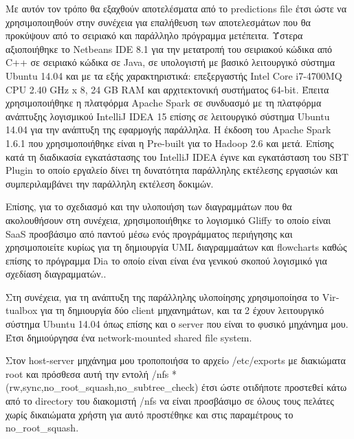 \documentclass{report}
\begin{document}
Με αυτόν τον τρόπο θα εξαχθούν αποτελέσματα από το \textlatin{predictions file} έτσι ώστε να χρησιμοποιηθούν στην συνέχεια για επαλήθευση των αποτελεσμάτων που θα προκύψουν από το σειριακό και παράλληλο πρόγραμμα μετέπειτα. Ύστερα αξιοποιήθηκε το \textlatin{Netbeans IDE} 8.1 για την μετατροπή του σειριακού κώδικα από \textlatin{C}++ σε σειριακό κώδικα σε \textlatin{Java}, σε υπολογιστή με βασικό λειτουργικό σύστημα \textlatin{Ubuntu} 14.04 και με τα εξής χαρακτηριστικά: επεξεργαστής \textlatin{Intel Core i7-4700MQ CPU 2.40 GHz x 8}, 24 \textlatin{GB RAM } και αρχιτεκτονική συστήματος 64-\textlatin{bit}. Έπειτα χρησιμοποιήθηκε η πλατφόρμα \textlatin{Apache Spark} σε συνδυασμό με τη πλατφόρμα ανάπτυξης λογισμικού \textlatin{IntelliJ IDEA} 15 επίσης σε λειτουργικό σύστημα \textlatin{Ubuntu} 14.04 για την ανάπτυξη της εφαρμογής παράλληλα. Η έκδοση του \textlatin{Apache Spark} 1.6.1 που χρησιμοποιήθηκε είναι η \textlatin{Pre-built} για το  \textlatin{Hadoop} 2.6 και μετά. Επίσης κατά τη διαδικασία εγκατάστασης του \textlatin{IntelliJ IDEA} έγινε και εγκατάσταση του \textlatin{SBT Plugin} το οποίο εργαλείο δίνει τη δυνατότητα παράλληλης εκτέλεσης εργασιών και συμπεριλαμβάνει την παράλληλη εκτέλεση δοκιμών.

Επίσης, για το σχεδιασμό και την υλοποιήση των διαγραμμάτων που θα ακολουθήσουν στη συνέχεια, χρησιμοποιήθηκε το λογισμικό \textlatin{Gliffy} το οποίο είναι \textlatin{SaaS} προσβάσιμο από παντού μέσω ενός προγράμματος περιήγησης και χρησιμοποιείτε κυρίως για τη δημιουργία \textlatin{UML} διαγραμμαάτων και \textlatin{flowcharts} καθώς επίσης το πρόγραμμα \textlatin{Dia} το οποίο είναι είναι ένα γενικού σκοπού λογισμικό για σχεδίαση διαγραμματών..  

Στη συνέχεια, για τη ανάπτυξη της παράλληλης υλοποίησης χρησιμοποίησα το \textlatin{Virtualbox} για τη δημιουργία δύο \textlatin{client} μηχανημάτων, και τα 2 έχουν λειτουργικό σύστημα \textlatin{Ubuntu} 14.04 όπως επίσης και ο \textlatin{server} που είναι το φυσικό μηχάνημα μου. Έτσι δημιούργησα ένα \textlatin{network-mounted shared file system}.

 Στον \textlatin{host-server} μηχάνημα μου τροποποιήσα το αρχείo \textlatin{/etc/exports} με διακιώματα \textlatin{root} και πρόσθεσα αυτή την εντολή \textlatin{/nfs} * \textlatin{(rw,sync,no\_root\_squash,no\_subtree\_check)} έτσι ώστε οτιδήποτε προστεθεί κάτω από το \textlatin{directory}  του διακομιστή \textlatin{/nfs} να είναι προσβάσιμο σε όλους τους πελάτες χωρίς δικαιώματα χρήστη για αυτό προστέθηκε και στις παραμέτρους το \textlatin{no\_}\textlatin{root\_}\textlatin{squash}.
\end{document}
